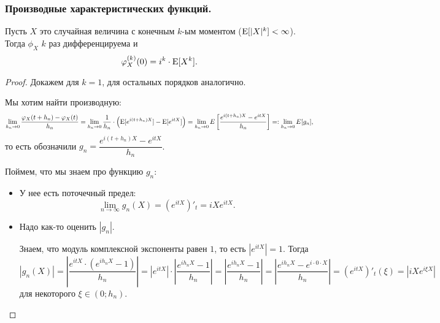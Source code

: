 \subsubsection{Производные характеристических функций.}

\begin{theorem*}
    Пусть $X$ это случайная величина с конечным $k$-ым моментом ($\operatorname{E}[|X|^k] < \infty$). Тогда $\phi_X$ $k$ раз дифференцируема и
    \begin{equation*}
        \varphi_{X}^{(k)}(0) = i^k \cdot \operatorname{E}[X^k].
    \end{equation*}
\end{theorem*}

\begin{proof}
    Докажем для $k = 1$, для остальных порядков аналогично.

    Мы хотим найти производную:
    \begin{align*}
        \lim_{h_n \to 0} \dfrac{\varphi_X(t + h_n) - \varphi_X(t)}{h_n}
        = \lim_{h_n \to 0} \dfrac{1}{h_n} \cdot \left(\operatorname{E}[e^{i (t + h_n) X}] - \operatorname{E}[e^{itX}]\right)
        = \lim_{h_n \to 0} E \left[\dfrac{e^{i (t + h_n) X} - e^{itX}}{h_n}\right]
        =: \lim_{h_n \to 0} E[g_n],
    \end{align*}
    то есть обозначили $g_n = \dfrac{e^{i (t + h_n) X} - e^{itX}}{h_n}$.

    Поймем, что мы знаем про функцию $g_n$:
    \begin{itemize}
    \item 
        У нее есть поточечный предел:
        \begin{equation*}
            \lim_{n \to \infty} g_n(X) = \left(e^{itX}\right)'_t = iX e^{itX}.
        \end{equation*}

    \item 
        Надо как-то оценить $|g_n|$.

        Знаем, что модуль комплексной экспоненты равен $1$, то есть $|e^{itX}| = 1$. Тогда
        \begin{equation*}
            |g_n(X)| 
            = \left|\dfrac{e^{itX} \cdot (e^{ih_nX} - 1)}{h_n}\right|
            = |e^{itX}| \cdot \left|\dfrac{e^{ih_nX} - 1}{h_n}\right|
            = \left|\dfrac{e^{ih_nX} - 1}{h_n}\right|
            = \left|\dfrac{e^{ih_nX} - e^{i \cdot 0 \cdot X}}{h_n}\right|
            = \left(e^{itX}\right)'_t(\xi)
            = \left|iX e^{i \xi X}\right|
        \end{equation*}
        для некоторого $\xi \in (0; h_n)$.


\end{itemize}
\end{proof}

